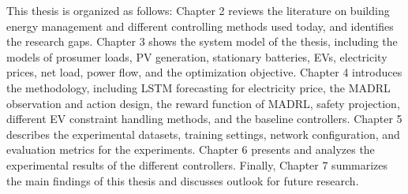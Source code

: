 This thesis is organized as follows: Chapter 2 reviews the literature on building energy management and different controlling methods used today, and identifies the research gaps. Chapter 3 shows the system model of the thesis, including the models of prosumer loads, PV generation, stationary batteries, EVs, electricity prices, net load, power flow, and the optimization objective. Chapter 4 introduces the methodology, including LSTM forecasting for electricity price, the MADRL observation and action design, the reward function of MADRL, safety projection, different EV constraint handling methods, and the baseline controllers. Chapter 5 describes the experimental datasets, training settings, network configuration, and evaluation metrics for the experiments. Chapter 6 presents and analyzes the experimental results of the different controllers. Finally, Chapter 7 summarizes the main findings of this thesis and discusses outlook for future research.
